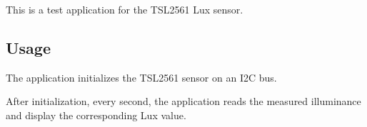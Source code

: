 This is a test application for the T\+S\+L2561 Lux sensor.

\subsection*{Usage}

The application initializes the T\+S\+L2561 sensor on an I2C bus.

After initialization, every second, the application reads the measured illuminance and display the corresponding Lux value. 